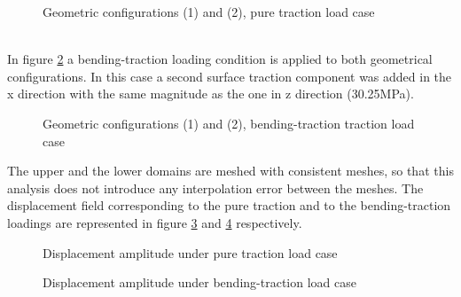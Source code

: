  \begin{figure}[!ht]
 \centering
      \caption{Geometric configurations (1) and (2), pure traction load case }
      \label{fig.13}
    \end{figure}
 \\
 In figure \ref{fig.14} a bending-traction loading condition is applied to both geometrical configurations. In this case a second surface traction component was added in the x direction with the same magnitude as the one in z direction (30.25MPa).
 \begin{figure}[!ht]
 \centering
      \caption{Geometric configurations (1) and (2), bending-traction traction load case }
      \label{fig.14}
    \end{figure}
 The upper and the lower domains are meshed with consistent meshes, so that this analysis does not introduce any interpolation error between the meshes. The displacement field corresponding to the pure traction and to the bending-traction loadings are represented in figure \ref{fig.15} and \ref{fig.16} respectively.
 \\
    \begin{figure}[!ht]
    \centering
      \caption{Displacement amplitude under pure traction load case }
      \label{fig.15}
    \end{figure}
    \begin{figure}[!ht]
    \centering
      \caption{Displacement amplitude under bending-traction load case }
      \label{fig.16}
    \end{figure}
